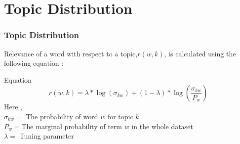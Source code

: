 \documentclass{beamer}
\begin{document}
	\section{Topic Distribution}
	\begin{frame}
		\frametitle{Topic Distribution}
		Relevance of a word with respect to a topic,$r(w, k)$, is calculated using the following equation :
			\begin{block}{Equation}
				\begin{equation*}
				r(w,k) = \lambda * \log(\sigma_{kw}) + (1 - \lambda)*\log\left(\frac{\sigma_{kw}}{P_w}\right)
				\end{equation*}
				Here ,\\ $\sigma_{kw} = $  The probability of word $w$ for topic $k$ \\ $P_w = $The marginal probability of term $w$ in the whole dataset\\$\lambda = $ Tuning parameter
			\end{block}
		
	\end{frame}
\end{document}
